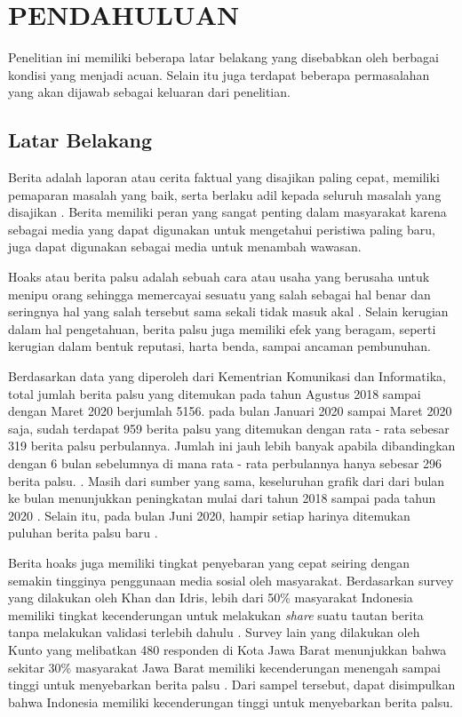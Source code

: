 \chapter{PENDAHULUAN}
\label{chap:pendahuluan}


Penelitian ini memiliki beberapa latar belakang yang disebabkan oleh berbagai kondisi yang menjadi acuan. Selain itu juga terdapat beberapa permasalahan yang akan dijawab sebagai keluaran dari penelitian.

\section{Latar Belakang}
\label{sec:latarbelakang}

Berita adalah laporan atau cerita faktual yang disajikan paling cepat, memiliki pemaparan masalah yang baik, serta berlaku adil kepada seluruh masalah yang disajikan \cite{rani2013persepsi}. Berita memiliki peran yang sangat penting dalam masyarakat karena sebagai media yang dapat digunakan untuk mengetahui peristiwa paling baru, juga dapat digunakan sebagai media untuk menambah wawasan.

Hoaks atau berita palsu adalah sebuah cara atau usaha yang berusaha untuk menipu orang sehingga memercayai sesuatu yang salah sebagai hal benar dan seringnya hal yang salah tersebut sama sekali tidak masuk akal \cite{berita_bohong}. Selain kerugian dalam hal pengetahuan, berita palsu juga memiliki efek yang beragam, seperti kerugian dalam bentuk reputasi, harta benda, sampai ancaman pembunuhan.

Berdasarkan data yang diperoleh dari Kementrian Komunikasi dan Informatika, total jumlah berita palsu yang ditemukan pada tahun Agustus 2018 sampai dengan Maret 2020 berjumlah 5156. pada bulan Januari 2020 sampai Maret 2020 saja, sudah terdapat 959 berita palsu yang ditemukan dengan rata - rata sebesar 319 berita palsu perbulannya. Jumlah ini jauh lebih banyak apabila dibandingkan dengan 6 bulan sebelumnya di mana rata - rata perbulannya hanya sebesar 296 berita palsu. \cite{kominfoStatHoax}. Masih dari sumber yang sama, keseluruhan grafik dari dari bulan ke bulan menunjukkan peningkatan mulai dari tahun 2018 sampai pada tahun 2020 \cite{kominfoStatHoax}. Selain itu, pada bulan Juni 2020, hampir setiap harinya ditemukan puluhan berita palsu baru \cite{kominfoJuni2020}.

Berita hoaks juga memiliki tingkat penyebaran yang cepat seiring dengan semakin tingginya penggunaan media sosial oleh masyarakat. Berdasarkan survey yang dilakukan oleh Khan dan Idris, lebih dari 50\% masyarakat Indonesia memiliki tingkat kecenderungan untuk melakukan \textit{share} suatu tautan berita tanpa melakukan validasi terlebih dahulu \cite{khan}. Survey lain yang dilakukan oleh Kunto yang melibatkan 480 responden di Kota Jawa Barat menunjukkan bahwa sekitar 30\% masyarakat Jawa Barat memiliki kecenderungan menengah sampai tinggi untuk menyebarkan berita palsu \cite{kuntoUmur}. Dari sampel tersebut, dapat disimpulkan bahwa Indonesia memiliki kecenderungan tinggi untuk menyebarkan berita palsu.

